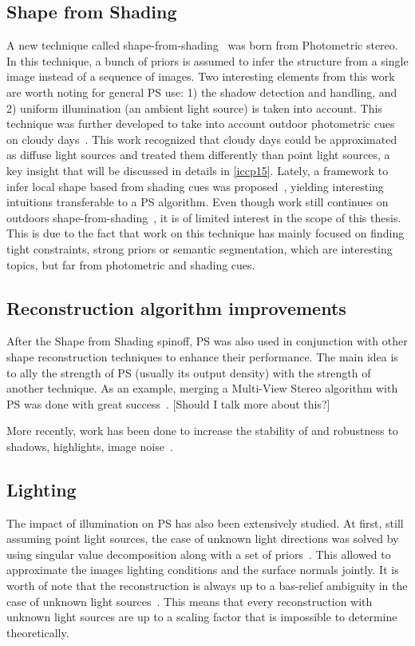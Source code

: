 \subsection{Shape from Shading}
A new technique called shape-from-shading~\cite{Horn1989} was born from Photometric stereo. In this technique, a bunch of priors is assumed to infer the structure from a single image instead of a sequence of images. Two interesting elements from this work are worth noting for general PS use: 1) the shadow detection and handling, and 2) uniform illumination (an ambient light source) is taken into account. This technique was further developed to take into account outdoor photometric cues on cloudy days~\cite{Langer1994}. This work recognized that cloudy days could be approximated as diffuse light sources and treated them differently than point light sources, a key insight that will be discussed in details in \ref{iccp15}. Lately, a framework to infer local shape based from shading cues was proposed~\cite{Xiong2013}, yielding interesting intuitions transferable to a PS algorithm. Even though work still continues on outdoors shape-from-shading~\cite{oxholm-eccv-12,johnson-cvpr-11,barron-pami-15}, it is of limited interest in the scope of this thesis. This is due to the fact that work on this technique has mainly focused on finding tight constraints, strong priors or semantic segmentation, which are interesting topics, but far from photometric and shading cues.

\subsection{Reconstruction algorithm improvements}
After the Shape from Shading spinoff, PS was also used in conjunction with other shape reconstruction techniques to enhance their performance. The main idea is to ally the strength of PS (usually its output density) with the strength of another technique. As an example, merging a Multi-View Stereo algorithm with PS was done with great success~\cite{HernandezEsteban2008}.
[Should I talk more about this?]

More recently, work has been done to increase the stability of and robustness to shadows, highlights, image noise~\cite{BarskyPetrou-pami-2003,ikehata-cvpr-12,ikehata-cvpr-14}.

\subsection{Lighting}
The impact of illumination on PS has also been extensively studied. At first, still assuming point light sources, the case of unknown light directions was solved by using singular value decomposition along with a set of priors~\cite{Hayakawa1994}. This allowed to approximate the images lighting conditions and the surface normals jointly. It is worth of note that the reconstruction is always up to a bas-relief ambiguity in the case of unknown light sources~\cite{Belhumeur1999}. This means that every reconstruction with unknown light sources are up to a scaling factor that is impossible to determine theoretically.

